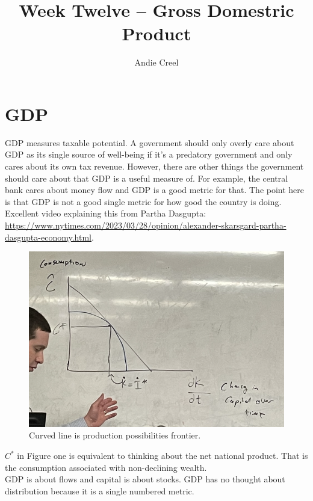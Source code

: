 \documentclass[12pt]{article}
\title{Week Twelve -- Gross Domestric Product}
\author{Andie Creel}
\begin{document}
\maketitle

\section{GDP}

GDP measures taxable potential. A government should only overly care about GDP as its single source of well-being if it's a predatory government and only cares about its own tax revenue. However, there are other things the government should care about that GDP is a useful measure of. For example, the central bank cares about money flow and GDP is a good metric for that. The point here is that GDP is not a good single metric for how good the country is doing. \\


Excellent video explaining this from Partha Dasgupta: \url{https://www.nytimes.com/2023/03/28/opinion/alexander-skarsgard-partha-dasgupta-economy.html}.

\begin{figure}[htp]
    \centering
    \includegraphics[width=14cm]{Screen Shot 2023-04-17 at 9.17.12 AM.png}
    \caption{Curved line is production possibilities frontier. }
\end{figure}

$C^*$ in Figure one is equivalent to thinking about the net national product. That is the consumption associated with non-declining wealth. \\

GDP is about flows and capital is about stocks. GDP has no thought about distribution because it is a single numbered metric. 
\end{document}
